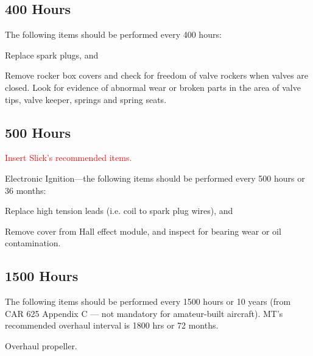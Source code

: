 \subsection{400 Hours} The following items should be performed every 400 hours: 
\begin{enumerate*}
	\item Replace spark plugs, and 
	\item Remove rocker box covers and check for freedom of valve rockers when valves are closed. Look for evidence of abnormal wear or broken parts in the area of valve tips, valve keeper, springs and spring seats. 
\end{enumerate*}

\subsection{500 Hours} 
\begin{enumerate*}
	\item\textcolor{red}{Insert Slick's recommended items.} 
	\item Electronic Ignition---the following items should be performed every 500 hours or 36 months: 
	\begin{enumerate*}
		\item Replace high tension leads (i.e. coil to spark plug wires), and 
		\item Remove cover from Hall effect module, and inspect for bearing wear or oil contamination. 
	\end{enumerate*}
\end{enumerate*}

\subsection{1500 Hours} The following items should be performed every 1500 hours or 10 years (from CAR 625 Appendix C --- not mandatory for amateur-built aircraft). MT's recommended overhaul interval is 1800 hrs or 72 months.
\begin{enumerate*}
	\item Overhaul propeller. 
\end{enumerate*}

